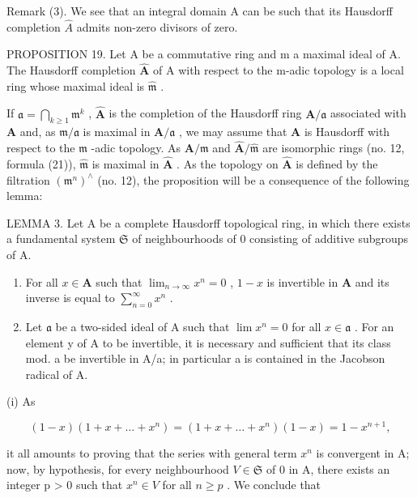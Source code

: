Remark (3). We see that an integral domain A can be such that its Hausdorff completion \(\hat{A}\) admits non-zero divisors of zero.

PROPOSITION 19. Let A be a commutative ring and m a maximal ideal of A. The Hausdorff completion \(\hat{\mathbf{A}}\) of A with respect to the m-adic topology is a local ring whose maximal ideal is \(\hat{\mathfrak{m}}\) .

If \(\mathfrak{a} = \bigcap_{k\geqslant 1}\mathfrak{m}^k\) , \(\hat{\mathbf{A}}\) is the completion of the Hausdorff ring \(\mathbf{A} / \mathfrak{a}\) associated with \(\mathbf{A}\) and, as \(\mathfrak{m} / \mathfrak{a}\) is maximal in \(\mathbf{A} / \mathfrak{a}\) , we may assume that \(\mathbf{A}\) is Hausdorff with respect to the \(\mathfrak{m}\) -adic topology. As \(\mathbf{A} / \mathfrak{m}\) and \(\hat{\mathbf{A}} /\hat{\mathfrak{m}}\) are isomorphic rings (no. 12, formula (21)), \(\hat{\mathfrak{m}}\) is maximal in \(\hat{\mathbf{A}}\) . As the topology on \(\hat{\mathbf{A}}\) is defined by the filtration \((\mathfrak{m}^n)^{\wedge}\) (no. 12), the proposition will be a consequence of the following lemma:

LEMMA 3. Let A be a complete Hausdorff topological ring, in which there exists a fundamental system \(\mathfrak{S}\) of neighbourhoods of 0 consisting of additive subgroups of A.

\begin{enumerate}
\def\labelenumi{(\roman{enumi})}
\item
  For all \(x \in \mathbf{A}\) such that \(\lim_{n \to \infty} x^n = 0\) , \(1 - x\) is invertible in \(\mathbf{A}\) and its inverse is equal to \(\sum_{n=0}^{\infty} x^n\) .
\item
  Let \(\mathfrak{a}\) be a two-sided ideal of A such that \(\lim x^n = 0\) for all \(x \in \mathfrak{a}\) . For an element y of A to be invertible, it is necessary and sufficient that its class mod. a be invertible in A/a; in particular a is contained in the Jacobson radical of A.
\end{enumerate}

(i) As

\[
(1 - x) (1 + x + \dots + x ^ {n}) = (1 + x + \dots + x ^ {n}) (1 - x) = 1 - x ^ {n + 1},
\]

it all amounts to proving that the series with general term \(x^{n}\) is convergent in A; now, by hypothesis, for every neighbourhood \(V \in \mathfrak{S}\) of 0 in A, there exists an integer p \textgreater{} 0 such that \(x^{n} \in V\) for all \(n \geqslant p\) . We conclude that

